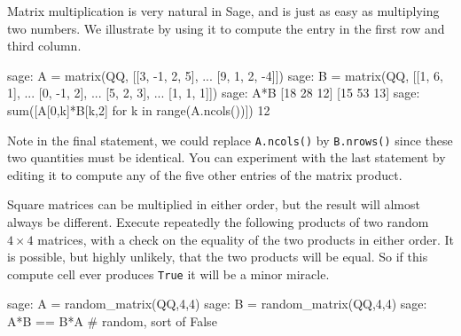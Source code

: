 Matrix multiplication is very natural in Sage, and is just as easy as multiplying two numbers.  We illustrate  by using it to compute the entry in the first row and third column.
%
\begin{sageexample}
sage: A = matrix(QQ, [[3, -1, 2,  5],
...                   [9,  1, 2, -4]])
sage: B = matrix(QQ, [[1,  6, 1],
...                   [0, -1, 2],
...                   [5,  2, 3],
...                   [1,  1, 1]])
sage: A*B
[18 28 12]
[15 53 13]
sage: sum([A[0,k]*B[k,2] for k in range(A.ncols())])
12
\end{sageexample}
%
Note in the final statement, we could replace \verb?A.ncols()? by \verb?B.nrows()? since these two quantities must be identical.  You can experiment with the last statement by editing it to compute any of the five other entries of the matrix product.\par
%
Square matrices can be multiplied in either order, but the result will almost always be different.  Execute repeatedly the following products of two random $4\times 4$ matrices, with a check on the equality of the two products in either order.  It is possible, but highly unlikely, that the two products will be equal.  So if this compute cell ever produces \verb?True? it will be a minor miracle.
%
\begin{sageexample}
sage: A = random_matrix(QQ,4,4)
sage: B = random_matrix(QQ,4,4)
sage: A*B == B*A       # random, sort of
False
\end{sageexample}
%
\begin{sageverbatim}
\end{sageverbatim}
%

